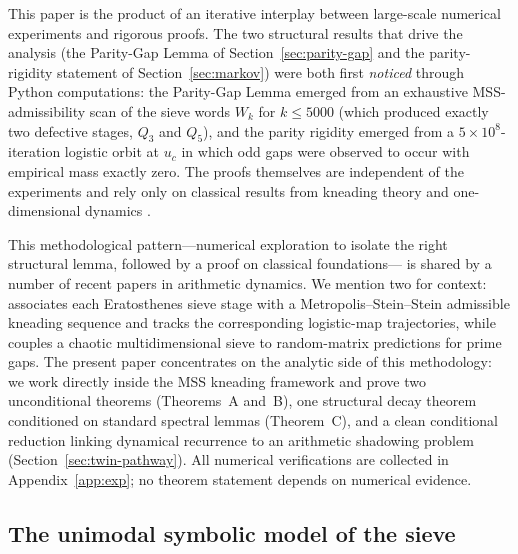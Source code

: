 \documentclass[11pt,a4paper]{article}
\theoremstyle{definition}
\begin{document}
This paper is the product of an iterative interplay between large-scale
numerical experiments and rigorous proofs. The two structural results
that drive the analysis (the Parity-Gap Lemma of
Section~\ref{sec:parity-gap} and the parity-rigidity statement of
Section~\ref{sec:markov}) were both first \emph{noticed} through Python
computations: the Parity-Gap Lemma emerged from an exhaustive
MSS-admissibility scan of the sieve words $W_k$ for $k \leq 5000$
(which produced exactly two defective stages, $Q_3$ and $Q_5$), and the
parity rigidity emerged from a $5 \times 10^8$-iteration logistic orbit
at $u_c$ in which odd gaps were observed to occur with empirical mass
exactly zero. The proofs themselves are independent of the experiments
and rely only on classical results from kneading theory and
one-dimensional dynamics
\cite{milnor1988iterated,misiurewicz1981absolutely,baladi2000positive}.

This methodological pattern---numerical exploration to isolate the
right structural lemma, followed by a proof on classical foundations---
is shared by a number of recent papers in arithmetic dynamics. We
mention two for context: \cite{wang2026emergence} associates each
Eratosthenes sieve stage with a Metropolis--Stein--Stein admissible
kneading sequence and tracks the corresponding logistic-map
trajectories, while \cite{chaoticsieve2025} couples a chaotic
multidimensional sieve to random-matrix predictions for prime gaps.
The present paper concentrates on the analytic side of this
methodology: we work directly inside the MSS kneading framework and
prove two unconditional theorems (Theorems~A and~B), one structural
decay theorem conditioned on standard spectral lemmas (Theorem~C),
and a clean conditional reduction linking dynamical recurrence to an
arithmetic shadowing problem (Section~\ref{sec:twin-pathway}). All
numerical verifications are collected in Appendix~\ref{app:exp}; no
theorem statement depends on numerical evidence.

\subsection{The unimodal symbolic model of the sieve}
\end{document}
